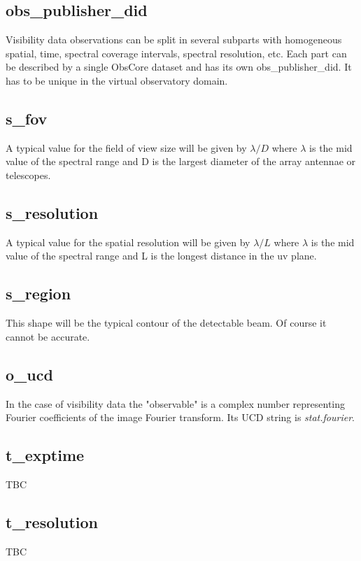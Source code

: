 \documentclass[11pt,a4paper]{ivoa}
\begin{document}
\subsection{obs\_publisher\_did}

Visibility data observations can be split in several subparts with homogeneous spatial, time, spectral coverage intervals, spectral resolution, etc. Each part can be described by a single ObsCore dataset and has its own obs\_publisher\_did. It has to be unique in the virtual observatory domain.

\subsection{s\_fov}
\label{sec:fov}

A typical value for the field of view size will be given by $\lambda / D$ where $\lambda$ is the mid value of the spectral range and D is the largest diameter of the array antennae or telescopes.
 
\subsection{s\_resolution}
\label{sec:res}

A typical value for the spatial resolution will be given by $\lambda / L$ where $\lambda$ is the mid value of the spectral range and L is the longest distance in the uv plane. 

\subsection{s\_region}

This shape will be the typical contour of the detectable beam. Of course it cannot be accurate. 

\subsection{o\_ucd}

In the case of visibility data the "observable" is a complex number representing Fourier coefficients of the image Fourier transform. Its UCD string is \emph{stat.fourier}. 

\subsection{t\_exptime}
TBC

\subsection{t\_resolution}
TBC 
\end{document}
